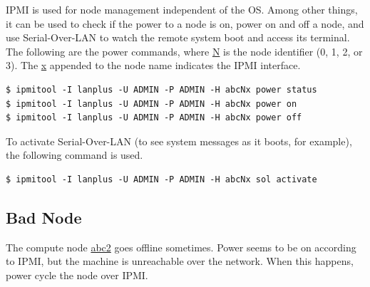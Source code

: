 \documentclass{article}
\begin{document}
IPMI is used for node management independent of the OS. Among other things, it
can be used to check if the power to a node is on, power on and off a node, and
use Serial-Over-LAN to watch the remote system boot and access its terminal.
The following are the power commands, where \url{N} is the node identifier (0,
1, 2, or 3). The \url{x} appended to the node name indicates the IPMI
interface.

\small {
\begin{verbatim}
$ ipmitool -I lanplus -U ADMIN -P ADMIN -H abcNx power status
$ ipmitool -I lanplus -U ADMIN -P ADMIN -H abcNx power on
$ ipmitool -I lanplus -U ADMIN -P ADMIN -H abcNx power off
\end{verbatim}
}

To activate Serial-Over-LAN (to see system messages as it boots, for example),
the following command is used.

\small {
\begin{verbatim}
$ ipmitool -I lanplus -U ADMIN -P ADMIN -H abcNx sol activate
\end{verbatim}
}


\subsection{Bad Node}

The compute node \url{abc2} goes offline sometimes. Power seems to be on
according to IPMI, but the machine is unreachable over the network. When this
happens, power cycle the node over IPMI.



\end{document}
